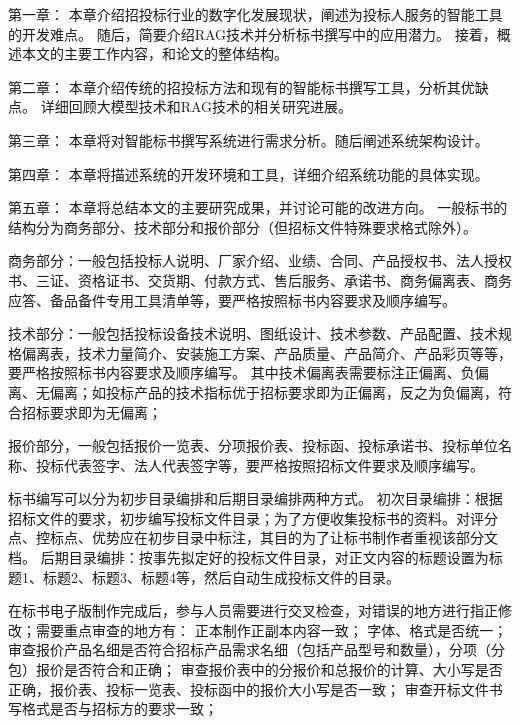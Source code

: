 \documentclass{xmu}
\begin{document}
第一章：
本章介绍招投标行业的数字化发展现状，阐述为投标人服务的智能工具的开发难点。
随后，简要介绍RAG技术并分析标书撰写中的应用潜力。
接着，概述本文的主要工作内容，和论文的整体结构。

第二章：
本章介绍传统的招投标方法和现有的智能标书撰写工具，分析其优缺点。
详细回顾大模型技术和RAG技术的相关研究进展。

第三章：
本章将对智能标书撰写系统进行需求分析。随后阐述系统架构设计。

第四章：
本章将描述系统的开发环境和工具，详细介绍系统功能的具体实现。

第五章：
本章将总结本文的主要研究成果，并讨论可能的改进方向。
一般标书的结构分为商务部分、技术部分和报价部分（但招标文件特殊要求格式除外）。

商务部分：一般包括投标人说明、厂家介绍、业绩、合同、产品授权书、法人授权书、三证、资格证书、交货期、付款方式、售后服务、承诺书、商务偏离表、商务应答、备品备件专用工具清单等，要严格按照标书内容要求及顺序编写。

技术部分：一般包括投标设备技术说明、图纸设计、技术参数、产品配置、技术规格偏离表，技术力量简介、安装施工方案、产品质量、产品简介、产品彩页等等，要严格按照标书内容要求及顺序编写。
其中技术偏离表需要标注正偏离、负偏离、无偏离；如投标产品的技术指标优于招标要求即为正偏离，反之为负偏离，符合招标要求即为无偏离；

报价部分，一般包括报价一览表、分项报价表、投标函、投标承诺书、投标单位名称、投标代表签字、法人代表签字等，要严格按照招标文件要求及顺序编写。

标书编写可以分为初步目录编排和后期目录编排两种方式。
初次目录编排：根据招标文件的要求，初步编写投标文件目录；为了方便收集投标书的资料。对评分点、控标点、优势应在初步目录中标注，其目的为了让标书制作者重视该部分文档。
后期目录编排：按事先拟定好的投标文件目录，对正文内容的标题设置为标题1、标题2、标题3、标题4等，然后自动生成投标文件的目录。

在标书电子版制作完成后，参与人员需要进行交叉检查，对错误的地方进行指正修改；需要重点审查的地方有：
正本制作正副本内容一致；
字体、格式是否统一；
审查报价产品名细是否符合招标产品需求名细（包括产品型号和数量），分项（分包）报价是否符合和正确；
审查报价表中的分报价和总报价的计算、大小写是否正确，报价表、投标一览表、投标函中的报价大小写是否一致；
审查开标文件书写格式是否与招标方的要求一致；
\end{document}
